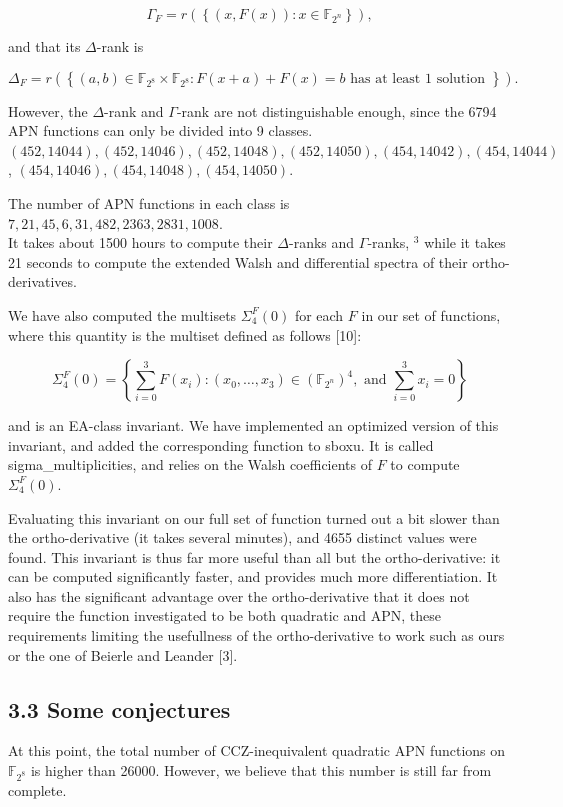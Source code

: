 \documentclass[10pt]{article}
\begin{document}
$$
\Gamma_{F}=r\left(\left\{(x, F(x)): x \in \mathbb{F}_{2^{n}}\right\}\right),
$$

and that its $\Delta$-rank is

$$
\Delta_{F}=r\left(\left\{(a, b) \in \mathbb{F}_{2^{8}} \times \mathbb{F}_{2^{8}}: F(x+a)+F(x)=b \text { has at least } 1 \text { solution }\right\}\right) .
$$

However, the $\Delta$-rank and $\Gamma$-rank are not distinguishable enough, since the 6794 APN functions can only be divided into 9 classes.\\
$(452,14044),(452,14046),(452,14048),(452,14050),(454,14042),(454,14044)$, $(454,14046),(454,14048),(454,14050)$.

The number of APN functions in each class is\\
$7,21,45,6,31,482,2363,2831,1008$.\\
It takes about 1500 hours to compute their $\Delta$-ranks and $\Gamma$-ranks, ${ }^{3}$ while it takes 21 seconds to compute the extended Walsh and differential spectra of their ortho-derivatives.

We have also computed the multisets $\Sigma_{4}^{F}(0)$ for each $F$ in our set of functions, where this quantity is the multiset defined as follows [10]:

$$
\Sigma_{4}^{F}(0)=\left\{\sum_{i=0}^{3} F\left(x_{i}\right):\left(x_{0}, \ldots, x_{3}\right) \in\left(\mathbb{F}_{2^{n}}\right)^{4}, \text { and } \sum_{i=0}^{3} x_{i}=0\right\}
$$

and is an EA-class invariant. We have implemented an optimized version of this invariant, and added the corresponding function to sboxu. It is called sigma\_multiplicities, and relies on the Walsh coefficients of $F$ to compute $\Sigma_{4}^{F}(0)$.

Evaluating this invariant on our full set of function turned out a bit slower than the ortho-derivative (it takes several minutes), and 4655 distinct values were found. This invariant is thus far more useful than all but the ortho-derivative: it can be computed significantly faster, and provides much more differentiation. It also has the significant advantage over the ortho-derivative that it does not require the function investigated to be both quadratic and APN, these requirements limiting the usefullness of the ortho-derivative to work such as ours or the one of Beierle and Leander [3].

\subsection*{3.3 Some conjectures}
At this point, the total number of CCZ-inequivalent quadratic APN functions on $\mathbb{F}_{2^{8}}$ is higher than 26000. However, we believe that this number is still far from complete.
\end{document}
